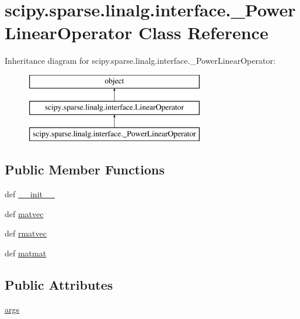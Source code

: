 \hypertarget{classscipy_1_1sparse_1_1linalg_1_1interface_1_1__PowerLinearOperator}{}\section{scipy.\+sparse.\+linalg.\+interface.\+\_\+\+Power\+Linear\+Operator Class Reference}
\label{classscipy_1_1sparse_1_1linalg_1_1interface_1_1__PowerLinearOperator}
Inheritance diagram for scipy.\+sparse.\+linalg.\+interface.\+\_\+\+Power\+Linear\+Operator\+:\begin{figure}[H]
\begin{center}
\leavevmode
\includegraphics[height=3.000000cm]{classscipy_1_1sparse_1_1linalg_1_1interface_1_1__PowerLinearOperator}
\end{center}
\end{figure}
\subsection*{Public Member Functions}
\begin{DoxyCompactItemize}
\item 
def \hyperlink{classscipy_1_1sparse_1_1linalg_1_1interface_1_1__PowerLinearOperator_a4c5d87fe01086cc2e5f4ff4b2addde2c}{\+\_\+\+\_\+init\+\_\+\+\_\+}
\item 
def \hyperlink{classscipy_1_1sparse_1_1linalg_1_1interface_1_1__PowerLinearOperator_a8ae906242ce999ee0c03f39ce935ed63}{matvec}
\item 
def \hyperlink{classscipy_1_1sparse_1_1linalg_1_1interface_1_1__PowerLinearOperator_ab2d5061f1f6aa99da0dccf857d63b523}{rmatvec}
\item 
def \hyperlink{classscipy_1_1sparse_1_1linalg_1_1interface_1_1__PowerLinearOperator_aca077d6819285feb70fda4b202a435e9}{matmat}
\end{DoxyCompactItemize}
\subsection*{Public Attributes}
\begin{DoxyCompactItemize}
\item 
\hyperlink{classscipy_1_1sparse_1_1linalg_1_1interface_1_1__PowerLinearOperator_af895abc23176add3b2f70b85d6d701b7}{args}
\end{DoxyCompactItemize}


